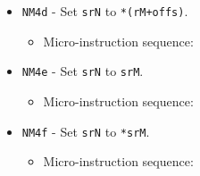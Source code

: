 \documentclass{article}
\def\specialtoaddr#1{\Verb|#1102| - output \Verb|sr#1| to addr bus}
\def\pkptrout{\Verb|0202| - output *\Verb|pk| to data bus}
\def\datatooffs{\Verb|4402| - write to \Verb|offs| from data bus}
\def\incrementpk{\Verb|0502| - increment \Verb|pk|}
\def\writeRAMo{\Verb|0104| - write data bus to *(addr bus+\Verb|offs|)}
\def\echodatalong{\Verb|0025| - echo data bus to itself for 3 cycles}
\def\done{\Verb|fffe| - end instruction}
\begin{document}
\begin{itemize}
    \item \Verb|NM4d| - Set \Verb|srN| to \Verb|*(rM+offs)|.
    \begin{itemize}
        \item Micro-instruction sequence:
    \end{itemize}

    \item \Verb|NM4e| - Set \Verb|srN| to \Verb|srM|.
    \begin{itemize}
        \item Micro-instruction sequence:
    \end{itemize}
    
    \item \Verb|NM4f| - Set \Verb|srN| to \Verb|*srM|.
    \begin{itemize}
        \item Micro-instruction sequence:
    \end{itemize}
    

\end{itemize}
\end{document}
